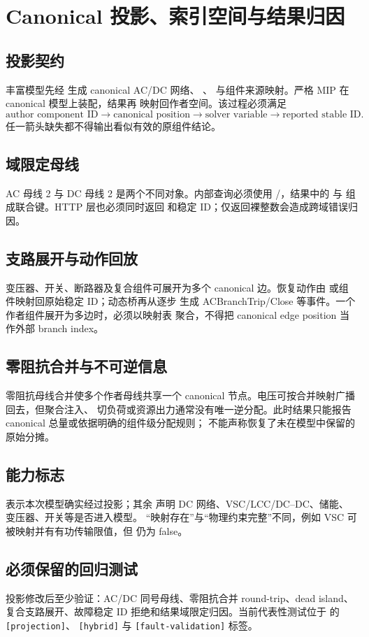 \section{Canonical 投影、索引空间与结果归因}\label{sec:res-projection}

\subsection{投影契约}
丰富模型先经  生成 canonical AC/DC 网络、
、 与组件来源映射。严格 MIP 在 canonical 模型上装配，结果再
映射回作者空间。该过程必须满足
\begin{equation}
 \text{author component ID}\rightarrow
 \text{canonical position}\rightarrow
 \text{solver variable}\rightarrow
 \text{reported stable ID}.
\end{equation}
任一箭头缺失都不得输出看似有效的原组件结论。

\subsection{域限定母线}
AC 母线 2 与 DC 母线 2 是两个不同对象。内部查询必须使用
/，结果中的
 与  组成联合键。HTTP 层也必须同时返回
 和稳定 ID；仅返回裸整数会造成跨域错误归因。

\subsection{支路展开与动作回放}
变压器、开关、断路器及复合组件可展开为多个 canonical 边。恢复动作由
 或组件映射回原始稳定 ID；动态桥再从逐步
 生成 ACBranchTrip/Close 等事件。一个作者组件展开为多边时，必须以映射表
聚合，不得把 canonical edge position 当作外部 branch index。

\subsection{零阻抗合并与不可逆信息}
零阻抗母线合并使多个作者母线共享一个 canonical 节点。电压可按合并映射广播回去，但聚合注入、
切负荷或资源出力通常没有唯一逆分配。此时结果只能报告 canonical 总量或依据明确的组件级分配规则；
不能声称恢复了未在模型中保留的原始分摊。

\subsection{能力标志}
 表示本次模型确实经过投影；其余
 声明 DC 网络、VSC/LCC/DC--DC、储能、变压器、开关等是否进入模型。
“映射存在”与“物理约束完整”不同，例如 VSC 可被映射并有有功传输限值，但
 仍为 false。

\subsection{必须保留的回归测试}
投影修改后至少验证：AC/DC 同号母线、零阻抗合并 round-trip、dead island、复合支路展开、故障稳定
ID 拒绝和结果域限定归因。当前代表性测试位于
 的 \texttt{[projection]}、
\texttt{[hybrid]} 与 \texttt{[fault-validation]} 标签。
